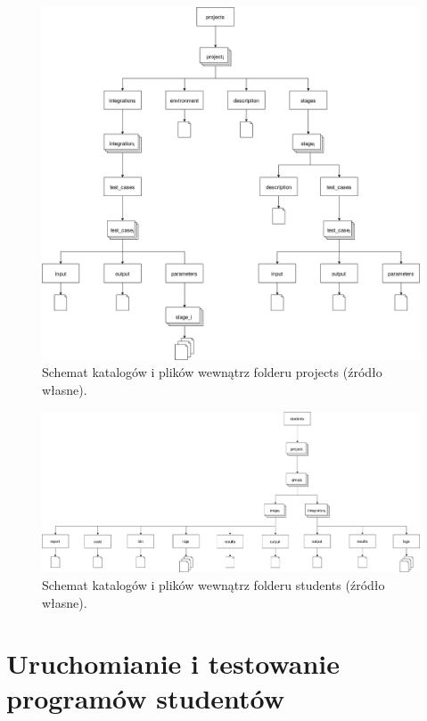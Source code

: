 \begin{figure}[H]
    \centering
    \includegraphics[width = 13cm]{chapter05/projects_dirs.png}
    \caption{Schemat katalogów i plików wewnątrz folderu projects (źródło własne).}
    \label{fig:projects-directories}
\end{figure}

\begin{figure}[H]
    \centering
    \includegraphics[width = 13cm]{chapter05/students_dirs.png}
    \caption{Schemat katalogów i plików wewnątrz folderu students (źródło własne).}
    \label{fig:students-directories}
\end{figure}

\section{Uruchomianie i testowanie programów studentów}
\label{run-and-test}

